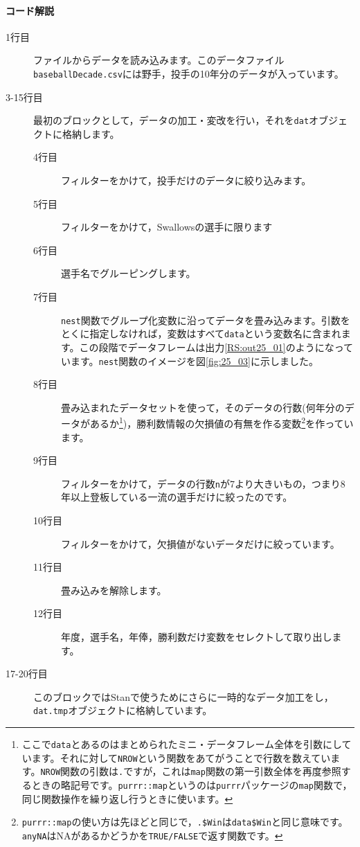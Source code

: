 \documentclass{ltjsbook}
\begin{document}
\paragraph{コード解説}
\begin{description}
	\item[1行目] ファイルからデータを読み込みます。このデータファイル\verb|baseballDecade.csv|には野手，投手の10年分のデータが入っています。
	\item[3-15行目] 最初のブロックとして，データの加工・変改を行い，それを\verb|dat|オブジェクトに格納します。
	      \begin{description}
		      \item[4行目] フィルターをかけて，投手だけのデータに絞り込みます。
		      \item[5行目] フィルターをかけて，Swallowsの選手に限ります
		      \item[6行目] 選手名でグルーピングします。
		      \item[7行目] \verb|nest|関数でグループ化変数に沿ってデータを畳み込みます。引数をとくに指定しなければ，変数はすべて\verb|data|という変数名に含まれます。この段階でデータフレームは出力\ref{RS:out25_01}のようになっています。\verb|nest|関数のイメージを図\ref{fig:25_03}に示しました。
		      \item[8行目] 畳み込まれたデータセットを使って，そのデータの行数(何年分のデータがあるか\footnote{ここで\verb|data|とあるのはまとめられたミニ・データフレーム全体を引数にしています。それに対して\verb|NROW|という関数をあてがうことで行数を数えています。\verb|NROW|関数の引数は\verb|.|ですが，これは\verb|map|関数の第一引数全体を再度参照するときの略記号です。\verb|purrr::map|というのは\verb|purrr|パッケージの\verb|map|関数で，同じ関数操作を繰り返し行うときに使います。})，勝利数情報の欠損値の有無を作る変数\footnote{\verb|purrr::map|の使い方は先ほどと同じで，\verb|.$Win|は\verb|data$Win|と同じ意味です。\verb|anyNA|はNAがあるかどうかを\verb|TRUE/FALSE|で返す関数です。}を作っています。
		      \item[9行目] フィルターをかけて，データの行数\verb|n|が7より大きいもの，つまり8年以上登板している一流の選手だけに絞ったのです。
		      \item[10行目] フィルターをかけて，欠損値がないデータだけに絞っています。
		      \item[11行目] 畳み込みを解除します。
		      \item[12行目] 年度，選手名，年俸，勝利数だけ変数をセレクトして取り出します。
	      \end{description}
	\item[17-20行目] このブロックではStanで使うためにさらに一時的なデータ加工をし，\verb|dat.tmp|オブジェクトに格納しています。

\end{description}
\end{document}
